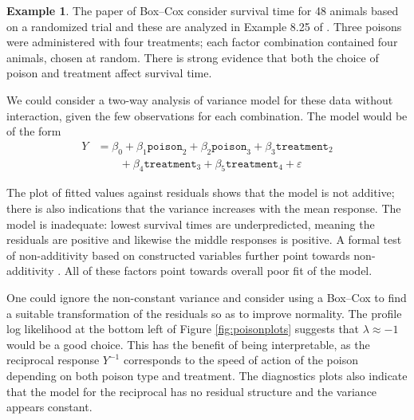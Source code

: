 \documentclass[
  11pt,
  letterpaper,
]{book}
\theoremstyle{definition}
\theoremstyle{definition}
\newtheorem{example}{Example}[chapter]
\theoremstyle{definition}
\theoremstyle{remark}
\begin{document}
\begin{example}
\protect\hypertarget{exm:poisonboxcox}{}{\label{exm:poisonboxcox} }
The paper of Box--Cox consider survival time for 48 animals based on a randomized trial and these are analyzed in Example 8.25 of \citet{SM:2008}. Three poisons were administered with four treatments; each factor combination contained four animals, chosen at random. There is strong evidence that both the choice of poison and treatment affect survival time.

We could consider a two-way analysis of variance model for these data without interaction, given the few observations for each combination. The model would be of the form
\begin{align*}
Y &= \beta_0 + \beta_1 \texttt{poison}_2 + \beta_2\texttt{poison}_3  +\beta_3\texttt{treatment}_2 \\ &\qquad+ \beta_4\texttt{treatment}_3
+\beta_5\texttt{treatment}_4 + \varepsilon
\end{align*}

The plot of fitted values against residuals shows that the model is not additive; there is also indications that the variance increases with the mean response. The model is inadequate: lowest survival times are underpredicted, meaning the residuals are positive and likewise the middle responses is positive. A formal test of non-additivity based on constructed variables further point towards non-additivity \citep[Example 8.24]{SM:2008}. All of these factors point towards overall poor fit of the model.

One could ignore the non-constant variance and consider using a Box--Cox to find a suitable transformation of the residuals so as to improve normality. The profile log likelihood at the bottom left of Figure \ref{fig:poisonplots} suggests that \(\lambda\approx -1\) would be a good choice. This has the benefit of being interpretable, as the reciprocal response \(Y^{-1}\) corresponds to the speed of action of the poison depending on both poison type and treatment. The diagnostics plots also indicate that the model for the reciprocal has no residual structure and the variance appears constant.
\end{example}
\end{document}
